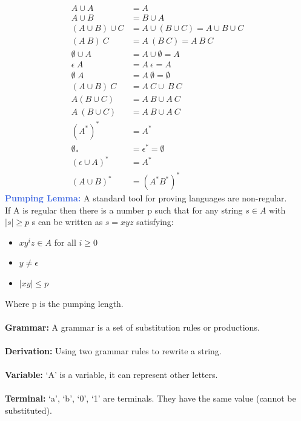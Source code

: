 \documentclass[a4paper,10pt]{article}
\begin{document}
\renewcommand{\labelitemi}{\textperiodcentered}
\begin{align*}
A \cup A &= A \\ 
A \cup B &= B \cup A \\
(A \cup B) \cup C &= A \cup (B \cup C) = A \cup B \cup C \\
(A \  B ) \ C &= A \ (B \ C) = A \ B \ C \\
\emptyset \cup A &= A \cup \emptyset = A  \\
\epsilon \ A &= A \ \epsilon = A \\
\emptyset \ A &= A \ \emptyset = \emptyset \\
(A \cup B) \  C &= A \ C \cup \ B \ C \\
A (B \cup C) &= A \ B \cup A \ C \\
A \ (B \cup C) &= A \ B \cup A \ C \\
(A^{*})^{*} &= A^{*} \\ 
\emptyset_{*} &= \epsilon^{*} = \emptyset \\
(\epsilon \cup A )^{*} &= A^{*} \\
(A \cup B)^{*} &= (A^{*}B^{*})^{*}
\end{align*}
\textcolor{RoyalBlue}{\textbf{Pumping Lemma: }} A standard tool for proving languages are non-regular. \\ 
If A is regular then there is a number p such that for any string $s \in A$ with $|s| \geq p$ s can be written as $s = xyz$  satisfying:
\renewcommand{\labelitemi}{\textperiodcentered}
\begin{itemize}
\item $xy^{i}z \in A$ for all $i \geq 0$
\item $y \neq \epsilon$
\item $|xy| \leq p$ 
\end{itemize}
Where p is the pumping length. \\\\ 
\newpage
\noindent \textcolor{PineGreen}{\textbf{Grammar:}} A grammar is a set of substitution rules or productions.  \\\\
\textcolor{PineGreen}{\textbf{Derivation:}} Using two grammar rules to rewrite a string.  \\\\
\textcolor{PineGreen}{\textbf{Variable:}} `A' is a variable, it can represent other letters. \\\\
\textcolor{PineGreen}{\textbf{Terminal:}} `a', `b', `0', `1' are terminals. They have the same value (cannot be substituted). \\\\
\end{document}
